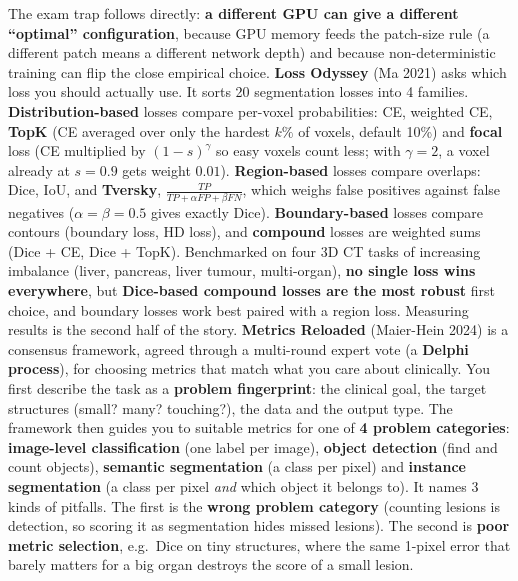 \documentclass[a4paper]{article}
\newcommand{\K}[1]{\textcolor{kg}{\textbf{#1}}}
\newcommand{\F}[1]{\textcolor{fb}{#1}}
\newcommand{\E}[1]{\textcolor{ep}{#1}}
\newcommand{\T}[1]{\textcolor{tr}{\textbf{#1}}}
\begin{document}
The exam trap follows directly: \T{a different GPU can give a different ``optimal'' configuration}, because GPU memory feeds the patch-size rule (a different patch means a different network depth) and because non-deterministic training can flip the close empirical choice. \K{Loss Odyssey} (Ma 2021) asks which loss you should actually use. It sorts 20 segmentation losses into 4 families. \K{Distribution-based} losses compare per-voxel probabilities: CE, weighted CE, \K{TopK} (CE averaged over only the hardest $k\%$ of voxels, \E{default 10\%}) and \K{focal} loss (CE multiplied by $(1-s)^\gamma$ so easy voxels count less; \E{with $\gamma{=}2$, a voxel already at $s{=}0.9$ gets weight $0.01$}). \K{Region-based} losses compare overlaps: Dice, IoU, and \K{Tversky}, \F{$\frac{TP}{TP+\alpha FP+\beta FN}$}, which weighs false positives against false negatives (\E{$\alpha{=}\beta{=}0.5$ gives exactly Dice}). \K{Boundary-based} losses compare contours (boundary loss, HD loss), and \K{compound} losses are weighted sums (\E{Dice + CE, Dice + TopK}). Benchmarked on four 3D CT tasks of increasing imbalance (liver, pancreas, liver tumour, multi-organ), \T{no single loss wins everywhere}, but \K{Dice-based compound losses are the most robust} first choice, and boundary losses work best paired with a region loss.
Measuring results is the second half of the story. \K{Metrics Reloaded} (Maier-Hein 2024) is a consensus framework, agreed through a multi-round expert vote (a \K{Delphi process}), for choosing metrics that match what you care about clinically. You first describe the task as a \K{problem fingerprint}: the clinical goal, the target structures (small? many? touching?), the data and the output type. The framework then guides you to suitable metrics for one of \K{4 problem categories}: \K{image-level classification} (one label per image), \K{object detection} (find and count objects), \K{semantic segmentation} (a class per pixel) and \K{instance segmentation} (a class per pixel \emph{and} which object it belongs to). It names 3 kinds of pitfalls. The first is the \K{wrong problem category} (\E{counting lesions is detection, so scoring it as segmentation hides missed lesions}). The second is \K{poor metric selection}, e.g.\ Dice on tiny structures, where the same 1-pixel error that barely matters for a big organ destroys the score of a small lesion.
\end{document}
